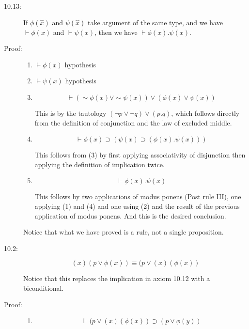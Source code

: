 \documentclass[12pt]{article}
\begin{document}
\begin{description}

\item[10.13:]  If $\phi(\hat{x})$ and $\psi(\hat{x})$ take argument of the same type, and we have $\vdash \phi(x)$ and $\vdash \psi(x)$, then we have $\vdash \phi(x).\psi(x)$.

\item[Proof:]  

\begin{enumerate}

\item $\vdash \phi(x)$  hypothesis

\item $\vdash \psi(x)$ hypothesis

\item $$\vdash (\sim\phi(x) \vee \sim \psi(x)) \vee (\phi(x) \vee \psi(x))$$

This is by the tautology $(\neg p \vee \neg q) \vee (p . q)$, which follows directly from the definition of conjunction and the law of excluded middle.

\item $$\vdash \phi(x) \supset (\psi (x) \supset (\phi(x).\psi(x)))$$

This follows from (3) by first applying associativity of disjunction then applying the definition of implication twice.

\item  $$\vdash \phi(x).\psi(x)$$

This follows by two applications of modus ponens (Post rule III), one applying (1) and (4)  and one using (2) and the result of the previous application of modus ponens.  And this is the desired conclusion.

\end{enumerate}

Notice that what we have proved is a rule, not a single proposition.

\item[10.2:]  $$(x)(p \vee \phi(x)) \equiv (p \vee (x)(\phi(x))$$

Notice that this replaces the implication in axiom 10.12 with a biconditional.

\item[Proof:]

\begin{enumerate}

\item  $$\vdash (p \vee (x)(\phi(x)) \supset (p \vee \phi(y))$$


\end{enumerate}
\end{description}
\end{document}

